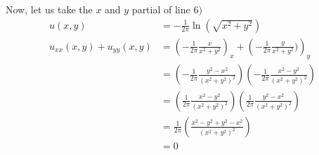 Now, let us take the $x$ and $y$ partial of line $6)$
%
\begin{align}
u(x, y)
& = - \frac{1}{2\pi} \ln\left( \sqrt{x^2 + y^2} \right)\\
u_{xx}(x, y) + u_{yy}(x, y)
& =
\left(- \frac{1}{2\pi} \frac{x}{x^2 + y^2} \right)_x +
\left(- \frac{1}{2\pi} \frac{y}{x^2 + y^2}) \right)_y\\
& =
\left(- \frac{1}{2\pi} \frac{y^2 - x^2}{(x^2 + y^2)^2} \right)
\left(- \frac{1}{2\pi} \frac{x^2 - y^2}{(x^2 + y^2)^2} \right)\\
& =
\left(\frac{1}{2\pi} \frac{x^2 - y^2}{(x^2 + y^2)^2} \right)
\left(\frac{1}{2\pi} \frac{y^2 - x^2}{(x^2 + y^2)^2} \right)\\
& =
\frac{1}{2\pi}\left( \frac{x^2 - y^2 + y^2 - x^2}{(x^2 + y^2)^2} \right)\\
& = 0
\end{align}

